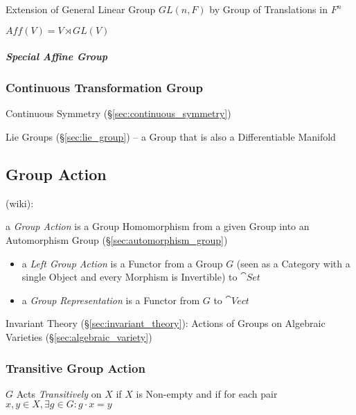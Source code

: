 Extension of General Linear Group $GL(n,F)$ by Group of Translations in $F^n$

$Aff(V) = V \rtimes GL(V)$



\subparagraph{Special Affine Group}\label{sec:special_affine_group}\hfill



\subsubsection{Continuous Transformation Group}
\label{sec:continuous_transformation_group}

Continuous Symmetry (\S\ref{sec:continuous_symmetry})

Lie Groups (\S\ref{sec:lie_group}) -- a Group that is also a
Differentiable Manifold



\subsection{Group Action}\label{sec:group_action}

(wiki):

a \emph{Group Action} is a Group Homomorphism from a given Group into an
Automorphism Group (\S\ref{sec:automorphism_group})

\begin{itemize}
  \item a \emph{Left Group Action} is a Functor from a Group $G$ (seen as a
    Category with a single Object and every Morphism is Invertible) to
    $\cat{Set}$
  \item a \emph{Group Representation} is a Functor from $G$ to $\cat{Vect}$
\end{itemize}

Invariant Theory (\S\ref{sec:invariant_theory}): Actions of Groups on
Algebraic Varieties (\S\ref{sec:algebraic_variety})



\subsubsection{Transitive Group Action}\label{sec:transitive_action}

$G$ Acts \emph{Transitively} on $X$ if $X$ is Non-empty and if for each pair
$x,y \in X, \exists g \in G : g \cdot x = y$

